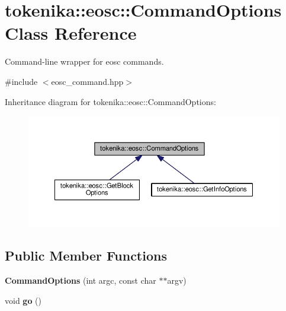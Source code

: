 \hypertarget{classtokenika_1_1eosc_1_1_command_options}{}\section{tokenika\+:\+:eosc\+:\+:Command\+Options Class Reference}
\label{classtokenika_1_1eosc_1_1_command_options}


Command-\/line wrapper for eosc commands.  




{\ttfamily \#include $<$eosc\+\_\+command.\+hpp$>$}



Inheritance diagram for tokenika\+:\+:eosc\+:\+:Command\+Options\+:\nopagebreak
\begin{figure}[H]
\begin{center}
\leavevmode
\includegraphics[width=350pt]{classtokenika_1_1eosc_1_1_command_options__inherit__graph}
\end{center}
\end{figure}
\subsection*{Public Member Functions}
\begin{DoxyCompactItemize}
\item 
\mbox{\label{classtokenika_1_1eosc_1_1_command_options_a263a61f90aa324090e2d9d592b2d4ad6}} 
{\bfseries Command\+Options} (int argc, const char $\ast$$\ast$argv)
\item 
\mbox{\label{classtokenika_1_1eosc_1_1_command_options_a4fa1c9defc45b139e415c79c43b15e5d}} 
void {\bfseries go} ()
\end{DoxyCompactItemize}
